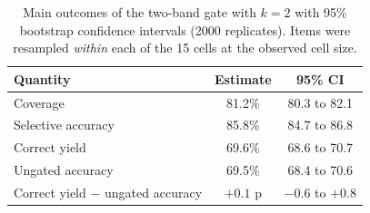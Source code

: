 \begin{table}[t]
\small\setlength{\tabcolsep}{3pt}
\caption{Main outcomes of the two-band gate with $k=2$ with 95\% bootstrap confidence intervals (2000 replicates). Items were resampled \emph{within} each of the 15 cells at the observed cell size.\label{tab:uncertainty}}
\begin{tabularx}{\textwidth}{lCC}
\toprule
\textbf{Quantity} & \textbf{Estimate} & \textbf{95\% CI} \\
\midrule
Coverage & 81.2\% & 80.3 to 82.1 \\
Selective accuracy & 85.8\% & 84.7 to 86.8 \\
Correct yield & 69.6\% & 68.6 to 70.7 \\
Ungated accuracy & 69.5\% & 68.4 to 70.6 \\
\midrule
Correct yield $-$ ungated accuracy & $+0.1$ p & $-0.6$ to $+0.8$ \\
\bottomrule
\end{tabularx}
\end{table}
